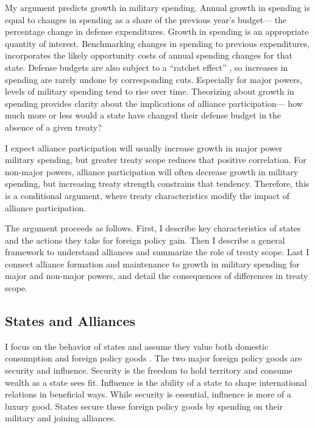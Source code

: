 \documentclass[12pt]{article}
\begin{document}
My argument predicts growth in military spending. 
Annual growth in spending is equal to changes in spending as a share of the previous year's budget--- the percentage change in defense expenditures. 
Growth in spending is an appropriate quantity of interest. 
Benchmarking changes in spending to previous expenditures, incorporates the likely opportunity costs of annual spending changes for that state. 
Defense budgets are also subject to a ``ratchet effect'' \cite{Zielinskietal2017}, so increases in spending are rarely undone by corresponding cuts.
Especially for major powers, levels of military spending tend to rise over time. 
Theorizing about growth in spending provides clarity about the implications of alliance participation--- how much more or less would a state have changed their defense budget in the absence of a given treaty? 


I expect alliance participation will usually increase growth in major power military spending, but greater treaty scope reduces that positive correlation. 
For non-major powers, alliance participation will often decrease growth in military spending, but increasing treaty strength constrains that tendency. 
Therefore, this is a conditional argument, where treaty characteristics modify the impact of alliance participation. 




The argument proceeds as follows.
First, I describe key characteristics of states and the actions they take for foreign policy gain. 
Then I describe a general framework to understand alliances and summarize the role of treaty scope. 
Last I connect alliance formation and maintenance to growth in military spending for major and non-major powers, and detail the consequences of differences in treaty scope.  



\subsection{States and Alliances}


I focus on the behavior of states and assume they value both domestic consumption and foreign policy goods \citep{Powell1993, Fearon2018}. 
The two major foreign policy goods are security and influence. 
Security is the freedom to hold territory and consume wealth as a state sees fit. 
Influence is the ability of a state to shape international relations in beneficial ways. 
While security is essential, influence is more of a luxury good. 
States secure these foreign policy goods by spending on their military and joining alliances. 
\end{document}
